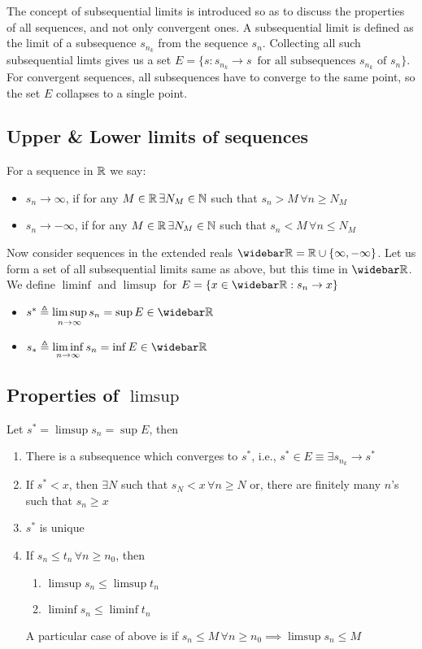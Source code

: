 The concept of subsequential limits is introduced so as to discuss the properties of all sequences, and not only convergent ones.
A subsequential limit is defined as the limit of a subsequence $s_{n_k}$ from the sequence $s_n$.
Collecting all such subsequential limts gives us a set $E=\{s:s_{n_k}\to s\, \text{ for all subsequences } s_{n_k} \text{ of } s_n\}$.
For convergent sequences, all subsequences have to converge to the same point, so the set $E$ collapses to a single point.
\subsection{Upper \& Lower limits of sequences}
For a sequence in $\mathbb{R}$ we say:
\begin{itemize}
\item $s_n\to \infty$, if for any $M\in \mathbb{R}\,\exists N_M\in\mathbb{N}$ such that $s_n>M\,\forall n\geq N_M$
\item $s_n\to -\infty$, if for any $M\in \mathbb{R}\,\exists N_M\in\mathbb{N}$ such that $s_n<M\,\forall n\leq N_M$
\end{itemize}

Now consider sequences in the extended reals $\bar{\reals}=\reals\cup\{\infty,-\infty\}$.
Let us form a set of all subsequential limits same as above, but this time in $\bar{\reals}$. 
We define $\liminf$ and $\limsup$ for $E=\{x\in\bar{\reals}:s_n\to x\}$
\begin{itemize}
\item $s^*\triangleq \limsup\limits_{n\to\infty} {s_n}=\sup{E}\in \bar{\reals}$
\item $s_*\triangleq \liminf\limits_{n\to\infty} {s_n}=\inf{E}\in \bar{\reals}$
\end{itemize}

\subsection{Properties of $\limsup$}
Let $s^*=\limsup{s_n}=\sup{E}$, then
\begin{enumerate}[label=P(ls)\arabic*.]
\item There is a subsequence which converges to $s^*$, i.e., $s^*\in E\equiv\exists s_{n_k}\to s^*$
\item If $s^*<x$, then $\exists N$ such that $s_N < x\,\forall n\geq N$ or, there are finitely many $n$'s such that $s_n\geq x$
\item $s^*$ is unique
\item If $s_n\leq t_n\,\forall n\geq n_0$, then
\begin{enumerate}[label=(\roman*)]
    \item $\limsup{s_n}\leq \limsup{t_n}$
    \item $\liminf{s_n}\leq \liminf{t_n}$
\end{enumerate}
A particular case of above is if $s_n\leq M\,\forall n\geq n_0\implies \limsup{s_n}\leq M$
\end{enumerate}

